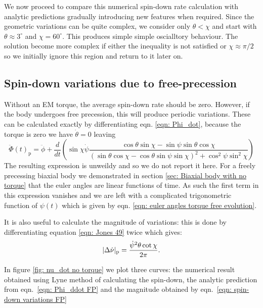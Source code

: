 \documentclass[/home/greg/Thesis/main/main.tex]{subfiles}
\begin{document}
We now proceed to compare this numerical spin-down rate calculation with analytic
predictions gradually introducing new features when required. Since the geometric
variations can be quite complex, we consider only $\theta < \chi$ and start 
with $\theta \approx 3^{\circ}$ and $\chi=60^{\circ}$. This produces simple
simple oscialltory behaviour. The solution become more complex if either
the inequality is not satisfied or $\chi \approx \pi/2$ so we initially
ignore this region and return to it later on.

\subsection{Spin-down variations due to free-precession}
Without an EM torque, the average spin-down rate should be zero. However, if
the body undergoes free precession, this will produce periodic variations. These
can be calculated exactly by differentiating eqn. \eqref{eqn: Phi_dot}, because
the torque is zero we have $\dot{\theta} = 0$ leaving
\begin{equation}
    \ddot{\Phi}(t)_{\mathrm{p}} = \ddot{\phi} + \frac{d}{dt}\left(
        \sin\chi\dot{\psi} \frac{\cos\theta\sin\chi - \sin \psi \sin \theta \cos\chi 
}{(\sin\theta \cos \chi - \cos \theta \sin \psi \sin \chi)^{2} + \cos^{2}\psi \sin^{2} \chi}
\right)
\label{eqn: Phi_ddot FP}
\end{equation}
The resulting expression is unweildy and so we do not report it here. For a 
freely precessing biaxial body we demonstrated in section \ref{sec: Biaxial body with no torque}
that the euler angles are linear functions of time. As such the first term 
in this expression vanishes and we are left with a complicated trigonometric
function of $\psi(t)$ which is given by eqn. \eqref{eqn: euler angles torque free evolution}.

It is also useful to calculate the magnitude of variations: this is done by
differentiating equation \eqref{eqn: Jones 49} twice which gives:
\begin{equation}
    |\Delta\dot{\nu}|_{\mathrm{p}} =\frac{\dot{\psi}^{2} \theta \cot\chi}{2\pi}. 
    \label{eqn: spin-down variations FP}
\end{equation}

In figure \ref{fig: nu_dot no torque} we plot three curves: the numerical
result obtained using Lyne method of calculating the spin-down, the analytic
prediction from eqn.~\eqref{eqn: Phi_ddot FP} and the magnitude obtained by
eqn.~\eqref{eqn: spin-down variations FP}
\end{document}
